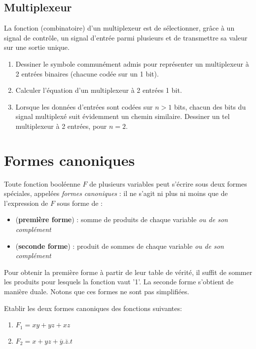 \documentclass[a4paper,11pt]{article}
\begin{document}
\subsection{Multiplexeur}
La fonction (combinatoire) d'un multiplexeur est de sélectionner, grâce à un signal de contrôle, un signal d'entrée parmi plusieurs et de transmettre sa valeur sur une sortie unique.
\begin{enumerate}
\item Dessiner le symbole communément admis pour représenter un multiplexeur à 2 entrées binaires (chacune codée sur un 1 bit).
\item Calculer l'équation d'un multiplexeur à 2 entrées 1 bit. 
\item Lorsque les données d'entrées sont codées sur $n>1$ bits, chacun des bits du signal multiplexé suit évidemment un chemin similaire. Dessiner un tel multiplexeur à 2 entrées, pour $n=2$.
\end{enumerate}


\section{Formes canoniques}

Toute fonction booléenne $F$ de plusieurs variables peut s'écrire sous deux formes spéciales, appelées {\it formes canoniques} : il ne s'agit ni plus ni moins que de l'expression de $F$ sous forme de :
\begin{itemize}
\item ({\bf première forme}) : somme de produits de chaque variable {\it ou de son complément}
\item ({\bf seconde forme}) : produit de sommes de chaque variable {\it ou de son complément}
\end{itemize}

Pour obtenir la première forme à partir de leur table de vérité, il suffit de sommer les produits pour lesquels la fonction vaut '1'. La seconde forme s'obtient de manière duale. Notons que ces formes ne sont pas simplifiées.

Etablir les deux formes canoniques des fonctions suivantes:

\begin{enumerate}
\item $F_1=xy+yz+xz$
\item $F_2=x+yz+\overline{y}.\overline{z}.t$
\end{enumerate}
\end{document}
